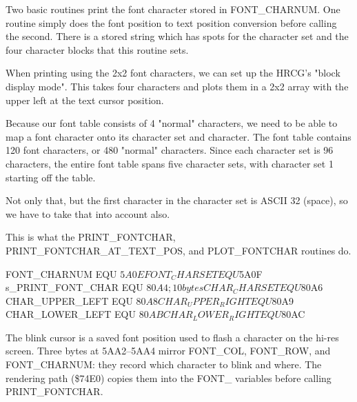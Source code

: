 \documentclass[10pt]{report}
\begin{document}
Two basic routines print the font character stored in {\Tt{}FONT{\_}CHARNUM\nwendquote}.
One routine simply does the font position to text position conversion before
calling the second. There is a stored string which has spots for the character
set and the four character blocks that this routine sets.

When printing using the 2x2 font characters, we can set up the HRCG's
"block display mode". This takes four characters and plots them in a 2x2
array with the upper left at the text cursor position.

Because our font table consists of 4 "normal" characters, we need to be able
to map a font character onto its character set and character. The font table
contains 120 font characters, or 480 "normal" characters. Since each
character set is 96 characters, the entire font table spans five character
sets, with character set 1 starting off the table.

Not only that, but the first character in the character set is ASCII 32
(space), so we have to take that into account also.

This is what the {\Tt{}PRINT{\_}FONTCHAR\nwendquote}, {\Tt{}PRINT{\_}FONTCHAR{\_}AT{\_}TEXT{\_}POS\nwendquote}, and
{\Tt{}PLOT{\_}FONTCHAR\nwendquote} routines do.

\nwenddocs{}\plusendmoddef\nwstartdeflinemarkup{}\nwenddeflinemarkup
FONT_CHARNUM        EQU     $5A0E
FONT_CHARSET        EQU     $5A0F
s_PRINT_FONT_CHAR   EQU     $80A4   ; 10 bytes
CHAR_CHARSET        EQU     $80A6
CHAR_UPPER_LEFT     EQU     $80A8
CHAR_UPPER_RIGHT    EQU     $80A9
CHAR_LOWER_LEFT     EQU     $80AB
CHAR_LOWER_RIGHT    EQU     $80AC
\nwendcode{}\nwdocspar

The blink cursor is a saved font position used to flash a character on the
hi-res screen.  Three bytes at {\Tt{}{\$}5AA2\nwendquote}--{\Tt{}{\$}5AA4\nwendquote} mirror {\Tt{}FONT{\_}COL\nwendquote},
{\Tt{}FONT{\_}ROW\nwendquote}, and {\Tt{}FONT{\_}CHARNUM\nwendquote}: they record which character to blink and
where.  The rendering path (\$74E0) copies them into the {\Tt{}FONT{\_}\nwendquote} variables
before calling {\Tt{}PRINT{\_}FONTCHAR\nwendquote}.
\end{document}
